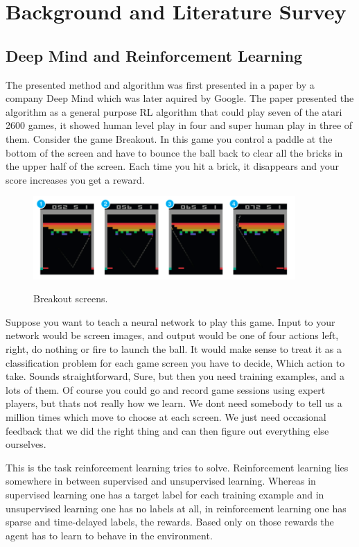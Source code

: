 \documentclass[a4paper,11pt]{report}
\begin{document}
	\newpage
	\chapter{Background and Literature Survey}
		\section{Deep Mind and Reinforcement Learning}

			The presented method and algorithm was first presented in a paper by a company Deep Mind which was later aquired by Google. The paper presented the algorithm as a general purpose RL algorithm that could play seven of the atari 2600 games, it showed human level play in four and super human play in three of them.
			Consider the game Breakout. In this game you control a paddle at the bottom of the screen and have to bounce the ball back to clear all the bricks in the upper half of the screen. Each time you hit a brick, it disappears and your score increases you get a reward.

			\begin{figure}[!ht]
				\begin{centering}
					\includegraphics[width=10cm]{../Design/images/breakout.png}\\
					\caption{Breakout screens.}
				\end{centering}
			\end{figure}
			Suppose you want to teach a neural network to play this game. Input to your network would be screen images, and output would be one of four actions left, right, do nothing or fire to launch the ball. It would make sense to treat it as a classification problem for each game screen you have to decide, Which action to take. Sounds straightforward, Sure, but then you need training examples, and a lots of them. Of course you could go and record game sessions using expert players, but thats not really how we learn. We dont need somebody to tell us a million times which move to choose at each screen. We just need occasional feedback that we did the right thing and can then figure out everything else ourselves.

			This is the task reinforcement learning tries to solve. Reinforcement learning lies somewhere in between supervised and unsupervised learning. Whereas in supervised learning one has a target label for each training example and in unsupervised learning one has no labels at all, in reinforcement learning one has sparse and time-delayed labels, the rewards. Based only on those rewards the agent has to learn to behave in the environment.
\end{document}
